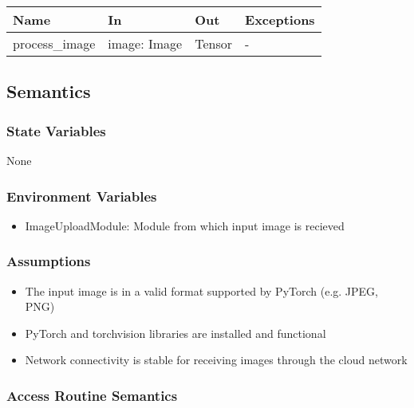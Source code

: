 \documentclass[12pt, titlepage]{article}
\begin{document}
\begin{center}
\begin{tabular}{p{5cm} p{3cm} p{3cm} p{2cm}}
\hline
\textbf{Name} & \textbf{In} & \textbf{Out} & \textbf{Exceptions} \\
\hline
process{\_}image & image: Image & Tensor & - \\
\hline
\end{tabular}
\end{center}

\subsection{Semantics}

\subsubsection{State Variables}
None



\subsubsection{Environment Variables}
\begin{itemize}
  \item ImageUploadModule: Module from which input image is recieved
\end{itemize}

\subsubsection{Assumptions}
\begin{itemize}
  \item The input image is in a valid format supported by PyTorch (e.g. JPEG, PNG)
  \item PyTorch and torchvision libraries are installed and functional
  \item Network connectivity is stable for receiving images through the cloud network
\end{itemize}


\subsubsection{Access Routine Semantics}
\end{document}
